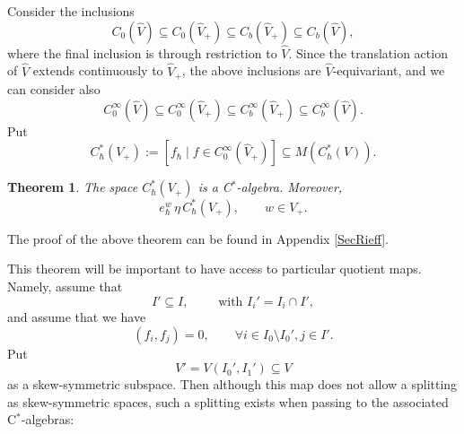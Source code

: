 \documentclass[11pt, reqno]{amsart}
\newtheorem{theorem}{Theorem}[section]
\theoremstyle{definition}
\numberwithin{equation}{section}
\begin{document}
Consider the inclusions
\begin{equation}\label{EqListInclusCont}
C_0(\hat{V}) \subseteq C_0(\hat{V}_+) \subseteq C_b(\hat{V}_+) \subseteq C_b(\hat{V}), 
\end{equation}
where the final inclusion is through restriction to $\hat{V}$. Since the translation action of $\hat{V}$ extends continuously to $\hat{V}_+$, the above inclusions are $\hat{V}$-equivariant, and we can consider also
\begin{equation}\label{EqListInclus}
C_0^{\infty}(\hat{V}) \subseteq C_0^{\infty}(\hat{V}_+) \subseteq C_b^{\infty}(\hat{V}_+) \subseteq C_b^{\infty}(\hat{V}). 
\end{equation}
Put
\begin{equation}\label{EqCStarCone}
C_{\hbar}^*(V_+) := [f_{\hbar}\mid f\in C_0^{\infty}(\hat{V}_+)] \subseteq M(C_{\hbar}^*(V)).
\end{equation}



\begin{theorem}\label{TheoAffil}
The space $C_{\hbar}^*(V_+)$ is a C$^*$-algebra. Moreover,  
\begin{equation}\label{EqAffExp}
e_{\hbar}^w \,\eta\, C_{\hbar}^*(V_+),\qquad w \in V_+.
\end{equation}
\end{theorem}
The proof of the above theorem can be found in Appendix \ref{SecRieff}.


This theorem will be important to have access to particular quotient maps. Namely, assume that 
\[
I' \subseteq I,\qquad \textrm{ with }I_i' = I_i\cap I',
\]
and assume that we have
\[
(f_i,f_j) = 0,\qquad \forall i \in I_0\setminus I_0',j\in I'.
\]
Put 
\[
V' = V(I_0',I_1') \subseteq V
\]
as a skew-symmetric subspace. Then although this map does not allow a splitting as skew-symmetric spaces, such a splitting exists when passing to the associated C$^*$-algebras:
\end{document}

